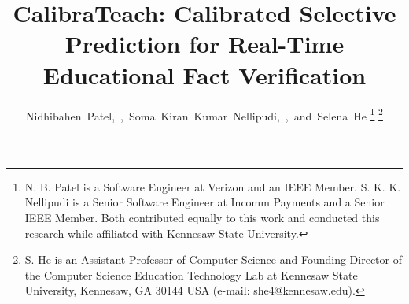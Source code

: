 \documentclass[journal]{IEEEtran}
\begin{document}

\title{CalibraTeach: Calibrated Selective Prediction for Real-Time Educational Fact Verification}

\author{Nidhibahen~Patel,~,~Soma~Kiran~Kumar~Nellipudi,~,~and~Selena~He
\thanks{N. B. Patel is a Software Engineer at Verizon and an IEEE Member. S. K. K. Nellipudi is a Senior Software Engineer at Incomm Payments and a Senior IEEE Member. Both contributed equally to this work and conducted this research while affiliated with Kennesaw State University.}
\thanks{S. He is an Assistant Professor of Computer Science and Founding Director of the Computer Science Education Technology Lab at Kennesaw State University, Kennesaw, GA 30144 USA (e-mail: she4@kennesaw.edu).}}

\end{document}
